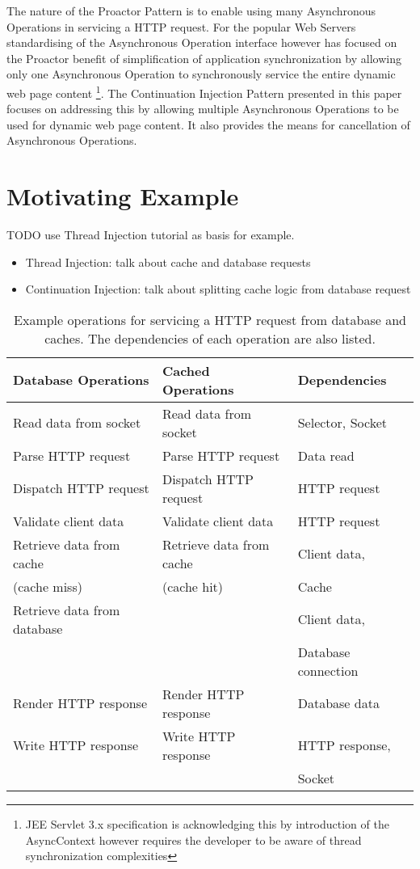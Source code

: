 \documentclass{article}
\begin{document}
The nature of the Proactor Pattern is to enable using many Asynchronous
Operations in servicing a HTTP request.  For the popular Web Servers
standardising of the Asynchronous Operation interface however has focused on the
Proactor benefit of simplification of application synchronization by allowing
only one Asynchronous Operation to synchronously service the entire dynamic web
page content \footnote{JEE Servlet 3.x specification is acknowledging this by
introduction of the AsyncContext however requires the developer to be aware of
thread synchronization complexities}.  The Continuation Injection Pattern
presented in this paper focuses on addressing this by allowing multiple
Asynchronous Operations to be used for dynamic web page content. It also
provides the means for cancellation of Asynchronous Operations.

\section{Motivating Example}

TODO use Thread Injection tutorial as basis for example.
\begin{itemize}
  \item Thread Injection: talk about cache and database requests
  \item Continuation Injection: talk about splitting cache logic from database request 
\end{itemize}


\begin{table}[!t]
\renewcommand{\arraystretch}{1.3}
\caption{Example operations for servicing a HTTP request from database and caches. The dependencies of each operation are also listed.}
\label{tab:example_request_operations}
\centering
\begin{tabular}{l||l||l}
\hline
\bfseries Database Operations & \bfseries Cached Operations & \bfseries Dependencies \\
\hline\hline
Read data from socket & Read data from socket & Selector, Socket \\
\hline
Parse HTTP request & Parse HTTP request & Data read \\
\hline
Dispatch HTTP request & Dispatch HTTP request & HTTP request \\
\hline
Validate client data & Validate client data & HTTP request \\
\hline
Retrieve data from cache & Retrieve data from cache & Client data, \\
(cache miss) & (cache hit) & Cache \\
\hline
Retrieve data from database & & Client data, \\
 & & Database connection \\
\hline
Render HTTP response & Render HTTP response & Database data \\
\hline
Write HTTP response & Write HTTP response & HTTP response, \\ 
 & & Socket \\
\hline
\end{tabular}
\end{table}
\end{document}
